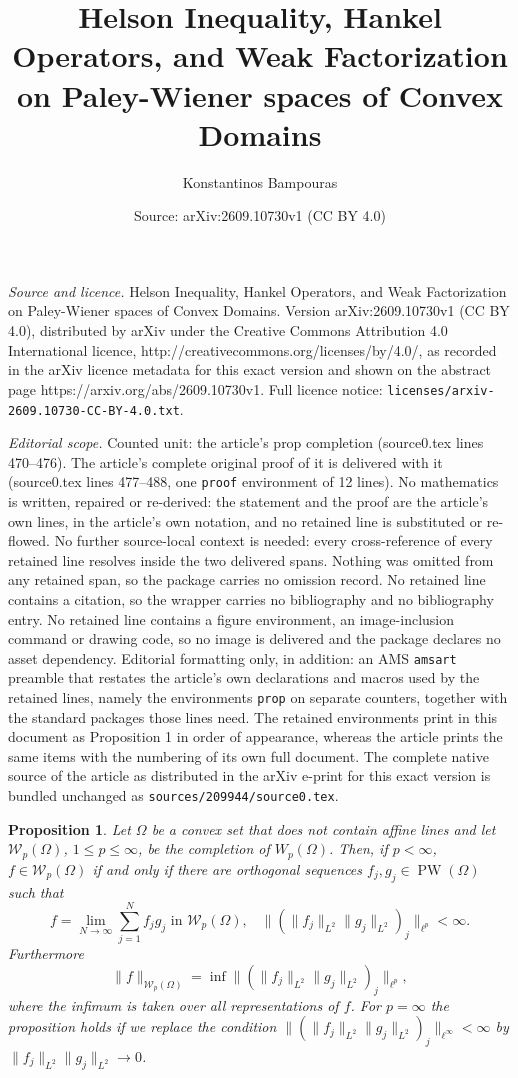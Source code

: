 \documentclass[10pt,a4paper]{amsart}
\title{Helson Inequality, Hankel Operators, and Weak Factorization on Paley-Wiener spaces of Convex Domains}
\author{Konstantinos Bampouras}
\date{Source: arXiv:2609.10730v1 (CC BY 4.0)}
\newtheorem{prop}{Proposition}
\DeclareMathOperator{\PW}{PW}
\begin{document}
\maketitle

\noindent\emph{Source and licence.} Helson Inequality, Hankel Operators, and Weak Factorization on Paley-Wiener spaces of Convex Domains. Version arXiv:2609.10730v1 (CC BY 4.0), distributed by arXiv under the Creative Commons Attribution 4.0 International licence, http://creativecommons.org/licenses/by/4.0/, as recorded in the arXiv licence metadata for this exact version and shown on the abstract page https://arxiv.org/abs/2609.10730v1. Full licence notice: \texttt{licenses/arxiv-2609.10730-CC-BY-4.0.txt}.\par\smallskip

\noindent\textit{Editorial scope.} Counted unit: the article's prop completion (source0.tex lines 470--476). The article's complete original proof of it is delivered with it (source0.tex lines 477--488, one \texttt{proof} environment of 12 lines). No mathematics is written, repaired or re-derived: the statement and the proof are the article's own lines, in the article's own notation, and no retained line is substituted or re-flowed.  No further source-local context is needed: every cross-reference of every retained line resolves inside the two delivered spans.  Nothing was omitted from any retained span, so the package carries no omission record.  No retained line contains a citation, so the wrapper carries no bibliography and no bibliography entry.  No retained line contains a figure environment, an image-inclusion command or drawing code, so no image is delivered and the package declares no asset dependency.  Editorial formatting only, in addition: an AMS \texttt{amsart} preamble that restates the article's own declarations and macros used by the retained lines, namely the environments \texttt{prop} on separate counters, together with the standard packages those lines need.  The retained environments print in this document as Proposition 1 in order of appearance, whereas the article prints the same items with the numbering of its own full document.  The complete native source of the article as distributed in the arXiv e-print for this exact version is bundled unchanged as \texttt{sources/209944/source0.tex}.
\begin{prop}\label{completion}
	Let $\Omega$ be a convex set that does not contain affine lines and let $\mathcal{W}_p(\Omega)$, $1\leq p\leq \infty$, be the completion of $W_p(\Omega)$. Then, if $p<\infty$, $f\in \mathcal{W}_p(\Omega)$ if and only if there are orthogonal sequences $f_j,g_j\in \PW(\Omega)$ such that
	$$f=\lim_{N\to \infty} \sum_{j=1}^N f_j g_j \text{ in $\mathcal{W}_p(\Omega)$,} \quad \| (\|f_j\|_{L^2}\|g_j\|_{L^2})_{j}\|_{\ell^p}<\infty.$$
	Furthermore
	$$\|f\|_{\mathcal{W}_p(\Omega)}=\inf \|(\|f_j\|_{L^2}\|g_j\|_{L^2})_j\|_{\ell^p},$$ where the infimum is taken over all representations of $f$.
	For $p=\infty$ the proposition holds if we replace the condition $\| (\|f_j\|_{L^2}\|g_j\|_{L^2})_{j}\|_{\ell^\infty}<\infty$ by $\|f_j\|_{L^2}\|g_j\|_{L^2}\to 0$.
\end{prop}
\end{document}

